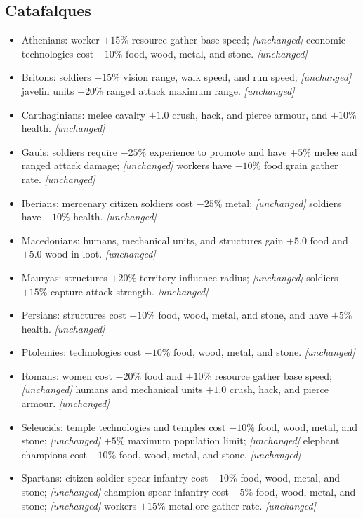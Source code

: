 \documentclass{article}
\begin{document}
\clearpage
\subsection{Catafalques}
\begin{itemize}
  \item Athenians:
  \subitem worker $+15\%$ resource gather base speed; \emph{[unchanged]}
  \subitem economic technologies cost $-10\%$ food, wood, metal, and stone. \emph{[unchanged]}
  \item Britons:
  \subitem soldiers $+15\%$ vision range, walk speed, and run speed; \emph{[unchanged]}
  \subitem javelin units $+20\%$ ranged attack maximum range. \emph{[unchanged]}
  \item Carthaginians:
  \subitem melee cavalry $+1.0$ crush, hack, and pierce armour, and $+10\%$ health. \emph{[unchanged]}
  \item Gauls:
  \subitem soldiers require $-25\%$ experience to promote and have $+5\%$ melee and ranged attack damage; \emph{[unchanged]}
  \subitem workers have $-10\%$ food.grain gather rate. \emph{[unchanged]}
  \item Iberians:
  \subitem mercenary citizen soldiers cost $-25\%$ metal; \emph{[unchanged]}
  \subitem soldiers have $+10\%$ health. \emph{[unchanged]}
  \item Macedonians:
  \subitem humans, mechanical units, and structures gain $+5.0$ food and $+5.0$ wood in loot. \emph{[unchanged]}
  \item Mauryas:
  \subitem structures $+20\%$ territory influence radius; \emph{[unchanged]}
  \subitem soldiers $+15\%$ capture attack strength. \emph{[unchanged]}
  \item Persians:
  \subitem structures cost $-10\%$ food, wood, metal, and stone, and have $+5\%$ health. \emph{[unchanged]}
  \item Ptolemies:
  \subitem technologies cost $-10\%$ food, wood, metal, and stone. \emph{[unchanged]}
  \item Romans:
  \subitem women cost $-20\%$ food and $+10\%$ resource gather base speed; \emph{[unchanged]}
  \subitem humans and mechanical units $+1.0$ crush, hack, and pierce armour. \emph{[unchanged]}
  \item Seleucids:
  \subitem temple technologies and temples cost $-10\%$ food, wood, metal, and stone; \emph{[unchanged]}
  \subitem $+5\%$ maximum population limit; \emph{[unchanged]}
  \subitem elephant champions cost $-10\%$ food, wood, metal, and stone. \emph{[unchanged]}
  \item Spartans:
  \subitem citizen soldier spear infantry cost $-10\%$ food, wood, metal, and stone; \emph{[unchanged]}
  \subitem champion spear infantry cost $-5\%$ food, wood, metal, and stone; \emph{[unchanged]}
  \subitem workers $+15\%$ metal.ore gather rate. \emph{[unchanged]}
\end{itemize}
\end{document}
